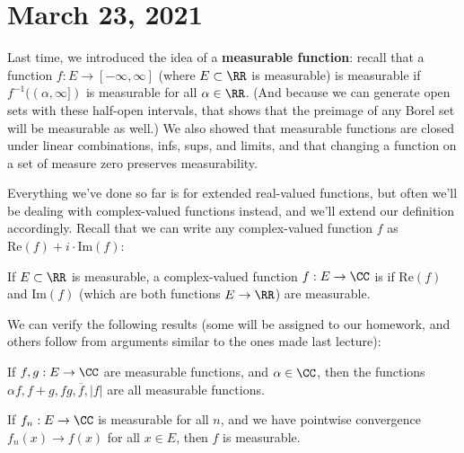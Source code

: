 
\pagebreak\section*{March 23, 2021}

Last time, we introduced the idea of a \textbf{measurable function}: recall that a function $f: E \to [-\infty, \infty]$ (where $E \subset \RR$ is measurable) is measurable if $f^{-1}((\alpha, \infty])$ is measurable for all $\alpha \in \RR$. (And because we can generate open sets with these half-open intervals, that shows that the preimage of any Borel set will be measurable as well.) We also showed that measurable functions are closed under linear combinations, infs, sups, and limits, and that changing a function on a set of measure zero preserves measurability.

Everything we've done so far is for extended real-valued functions, but often we'll be dealing with complex-valued functions instead, and we'll extend our definition accordingly. Recall that we can write any complex-valued function $f$ as $\text{Re}(f) + i \cdot \text{Im}(f)$:

\begin{definition}
If $E \subset \RR$ is measurable, a complex-valued function $f: E \to \CC$ is  if $\text{Re}(f)$ and $\text{Im}(f)$ (which are both functions $E \to \RR$) are measurable.
\end{definition}

We can verify the following results (some will be assigned to our homework, and others follow from arguments similar to the ones made last lecture):

\begin{theorem}\label{compmeaslincomb}
If $f, g: E \to \CC$ are measurable functions, and $\alpha \in \CC$, then the functions $\alpha f, f + g, fg, \overline{f}, |f|$ are all measurable functions.
\end{theorem}

\begin{theorem}
If $f_n: E \to \CC$ is measurable for all $n$, and we have pointwise convergence $f_n(x) \to f(x)$ for all $x \in E$, then $f$ is measurable.
\end{theorem}


